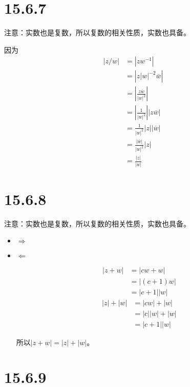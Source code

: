 \documentclass{article}
\begin{document}
\section*{15.6.7}

注意：实数也是复数，所以复数的相关性质，实数也具备。

因为
\begin{align*}
  |z/w| & = |zw^{-1}|                                \\
        & = \left|z|w|^{-2}\overline{w}\right|       \\
        & = \left|\frac{z\overline{w}}{|w|^2}\right| \\
        & = |\frac{1}{|w|^2}| |z\overline{w}|        \\
        & = \frac{1}{|w|^2} |z| |\overline{w}|       \\
        & = \frac{|\overline{w}|}{|w|^2} |z|         \\
        & = \frac{|z|}{|w|}
\end{align*}

\section*{15.6.8}

注意：实数也是复数，所以复数的相关性质，实数也具备。

\begin{itemize}
  \item $\Rightarrow$




  \item $\Leftarrow$

        \begin{align*}
          |z + w| & = |cw + w|    \\
                  & = |(c + 1) w| \\
                  & = |c + 1| |w|
        \end{align*}
        \begin{align*}
          |z| + |w| & = |cw| + |w|    \\
                    & = |c| |w| + |w| \\
                    & = |c + 1| |w|
        \end{align*}

        所以$|z + w| = |z| + |w|$。
\end{itemize}

\section*{15.6.9}
\end{document}
